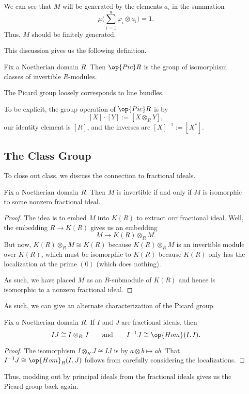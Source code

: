 \documentclass[../notes.tex]{subfiles}
\begin{document}
\begin{remark}
	We can see that $M$ will be generated by the elements $a_i$ in the summation
	\[\mu\Bigg(\sum_{i=1}^n\varphi_i\otimes a_i\Bigg)=1.\]
	Thus, $M$ should be finitely generated.
\end{remark}
This discussion gives us the following definition.
\begin{definition}
	Fix a Noetherian domain $R$. Then $\op{Pic}R$ is the group of isomorphism classes of invertible $R$-modules.
\end{definition}
\begin{remark}
	The Picard group loosely corresponds to line bundles.
\end{remark}
To be explicit, the group operation of $\op{Pic}R$ is by
\[[X]\cdot[Y]:=[X\otimes_RY],\]
our identity element is $[R]$, and the inverses are $[X]^{-1}:=\left[X^*\right]$.

\subsection{The Class Group}
To close out class, we discuss the connection to fractional ideals.
\begin{lemma}
	Fix a Noetherian domain $R$. Then $M$ is invertible if and only if $M$ is isomorphic to some nonzero fractional ideal.
\end{lemma}
\begin{proof}
	The idea is to embed $M$ into $K(R)$ to extract our fractional ideal. Well, the embedding $R\to K(R)$ gives us an embedding
	\[M\to K(R)\otimes_RM.\]
	But now, $K(R)\otimes_RM\cong K(R)$ because $K(R)\otimes_RM$ is an invertible module over $K(R)$, which must be isomorphic to $K(R)$ because $K(R)$ only has the localization at the prime $(0)$ (which does nothing).

	As such, we have placed $M$ as an $R$-submodule of $K(R)$ and hence is isomorphic to a nonzero fractional ideal.
\end{proof}
As such, we can give an alternate characterization of the Picard group.
\begin{lemma}
	Fix a Noetherian domain $R$. If $I$ and $J$ are fractional ideals, then
	\[IJ\cong I\otimes_RJ\qquad\text{and}\qquad I^{-1}J\cong\op{Hom}(I.J).\]
\end{lemma}
\begin{proof}
	The isomorphism $I\otimes_RJ\cong IJ$ is by $a\otimes b\mapsto ab$. That $I^{-1}J\cong\op{Hom}_R(I,J)$ follows from carefully considering the localizations.
\end{proof}
Thus, modding out by principal ideals from the fractional ideals gives us the Picard group back again.
\end{document}

